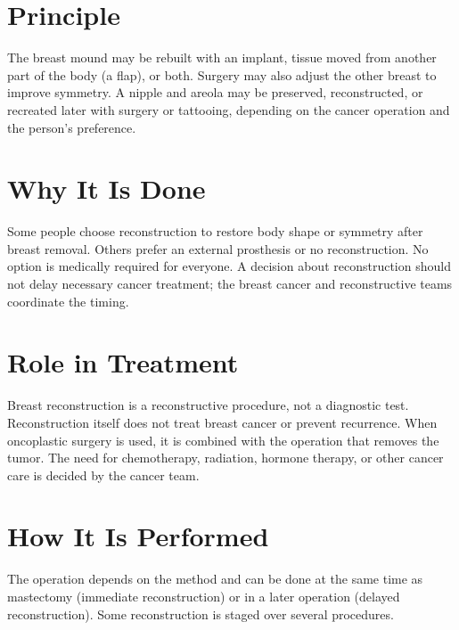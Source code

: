 \section*{Principle}
The breast mound may be rebuilt with an implant, tissue moved from another part of the body (a flap), or both. Surgery may also adjust the other breast to improve symmetry. A nipple and areola may be preserved, reconstructed, or recreated later with surgery or tattooing, depending on the cancer operation and the person's preference.

\section*{Why It Is Done}
Some people choose reconstruction to restore body shape or symmetry after breast removal. Others prefer an external prosthesis or no reconstruction. No option is medically required for everyone. A decision about reconstruction should not delay necessary cancer treatment; the breast cancer and reconstructive teams coordinate the timing.

\section*{Role in Treatment}
Breast reconstruction is a reconstructive procedure, not a diagnostic test. Reconstruction itself does not treat breast cancer or prevent recurrence. When oncoplastic surgery is used, it is combined with the operation that removes the tumor. The need for chemotherapy, radiation, hormone therapy, or other cancer care is decided by the cancer team.

\section*{How It Is Performed}
The operation depends on the method and can be done at the same time as mastectomy (immediate reconstruction) or in a later operation (delayed reconstruction). Some reconstruction is staged over several procedures.

